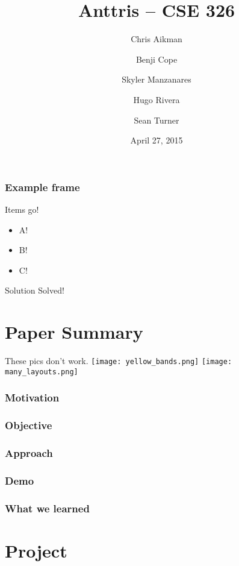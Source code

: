 \documentclass{beamer}
\title{Anttris -- CSE 326}
\author{%
\and Chris Aikman
\and Benji Cope
\and Skyler Manzanares
\and Hugo Rivera
\and Sean Turner}
\date{April 27, 2015}
\begin{document}
\begin{frame}
\titlepage
\end{frame}

\begin{frame}
    \frametitle{Example frame}
    Items go!
\begin{itemize}
\pause \item A!
\pause \item B!
\pause \item C!
\end{itemize}

\begin{alertblock}{Solution}
Solved!
\end{alertblock}

\end{frame}

\section{Paper Summary}
\begin{frame}
    These pics don't work.
\texttt{[image: yellow\_bands.png]}
\pause
\texttt{[image: many\_layouts.png]}
\end{frame}




\begin{frame}
  \frametitle{Motivation}
\end{frame}


\begin{frame}
  \frametitle{Objective}
\end{frame}


\begin{frame}
  \frametitle{Approach} %
\end{frame}


\begin{frame}
  \frametitle{Demo} %
\end{frame}


\begin{frame}
  \frametitle{What we learned} %
\end{frame}






\section{Project}
\end{document}
